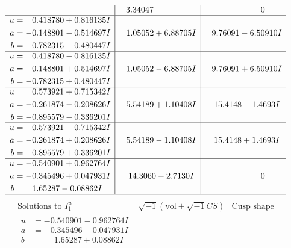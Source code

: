 \documentclass[1p]{elsarticle_modified}
\theoremstyle{definition}
\newcommand{\I}{\sqrt{-1}}
\begin{document}
$$\begin{array}{c|c|c}
 & \phantom{-}3.34047\phantom{ +0.000000I} & \phantom{-0.000000 } 0 \\ \hline\begin{aligned}
u &= \phantom{-}0.418780 + 0.816135 I \\
a &= -0.148801 - 0.514697 I \\
b &= -0.782315 - 0.480447 I\end{aligned}
 & \phantom{-}1.05052 + 6.88705 I & \phantom{-}9.76091 - 6.50910 I \\ \hline\begin{aligned}
u &= \phantom{-}0.418780 - 0.816135 I \\
a &= -0.148801 + 0.514697 I \\
b &= -0.782315 + 0.480447 I\end{aligned}
 & \phantom{-}1.05052 - 6.88705 I & \phantom{-}9.76091 + 6.50910 I \\ \hline\begin{aligned}
u &= \phantom{-}0.573921 + 0.715342 I \\
a &= -0.261874 - 0.208626 I \\
b &= -0.895579 - 0.336201 I\end{aligned}
 & \phantom{-}5.54189 + 1.10408 I & \phantom{-}15.4148 - 1.4693 I \\ \hline\begin{aligned}
u &= \phantom{-}0.573921 - 0.715342 I \\
a &= -0.261874 + 0.208626 I \\
b &= -0.895579 + 0.336201 I\end{aligned}
 & \phantom{-}5.54189 - 1.10408 I & \phantom{-}15.4148 + 1.4693 I \\ \hline\begin{aligned}
u &= -0.540901 + 0.962764 I \\
a &= -0.345496 + 0.047931 I \\
b &= \phantom{-}1.65287 - 0.08862 I\end{aligned}
 & \phantom{-}14.3060 - 2.7130 I & \phantom{-0.000000 } 0\\
 \hline 
 \end{array}$$\newpage$$\begin{array}{c|c|c}  
\text{Solutions to }I^u_{1}& \I (\text{vol} + \sqrt{-1}CS) & \text{Cusp shape}\\
 \hline 
\begin{aligned}
u &= -0.540901 - 0.962764 I \\
a &= -0.345496 - 0.047931 I \\
b &= \phantom{-}1.65287 + 0.08862 I\end{aligned}

\end{array}$$
\end{document}
